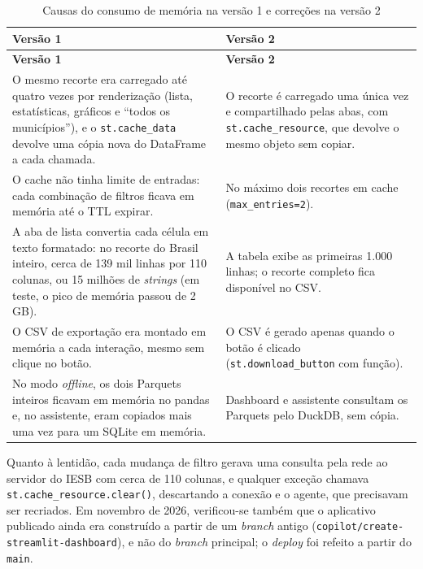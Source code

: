 \documentclass[12pt,a4paper]{report}
\begin{document}
\begin{longtable}{>{\raggedright\arraybackslash}p{} >{\raggedright\arraybackslash}p{}}
\caption{Causas do consumo de memória na versão 1 e correções na versão 2}\label{tab:memoria}\\
\toprule
\textbf{Versão 1} & \textbf{Versão 2} \\
\midrule
\endfirsthead
\toprule
\textbf{Versão 1} & \textbf{Versão 2} \\
\midrule
\endhead
O mesmo recorte era carregado até quatro vezes por renderização (lista, estatísticas,
gráficos e ``todos os municípios''), e o \texttt{st.cache\_data} devolve uma cópia nova
do DataFrame a cada chamada. &
O recorte é carregado uma única vez e compartilhado pelas abas, com
\texttt{st.cache\_resource}, que devolve o mesmo objeto sem copiar. \\
\midrule
O cache não tinha limite de entradas: cada combinação de filtros ficava em memória até o
TTL expirar. &
No máximo dois recortes em cache (\texttt{max\_entries=2}). \\
\midrule
A aba de lista convertia cada célula em texto formatado: no recorte do Brasil inteiro,
cerca de 139 mil linhas por 110 colunas, ou 15 milhões de \textit{strings} (em teste, o
pico de memória passou de 2 GB). &
A tabela exibe as primeiras 1.000 linhas; o recorte completo fica disponível no CSV. \\
\midrule
O CSV de exportação era montado em memória a cada interação, mesmo sem clique no botão. &
O CSV é gerado apenas quando o botão é clicado (\texttt{st.download\_button} com função). \\
\midrule
No modo \textit{offline}, os dois Parquets inteiros ficavam em memória no pandas e, no
assistente, eram copiados mais uma vez para um SQLite em memória. &
Dashboard e assistente consultam os Parquets pelo DuckDB, sem cópia. \\
\bottomrule
\end{longtable}

Quanto à lentidão, cada mudança de filtro gerava uma consulta pela rede ao servidor do
IESB com cerca de 110 colunas, e qualquer exceção chamava
\texttt{st.cache\_resource.clear()}, descartando a conexão e o agente, que precisavam ser recriados. Em novembro de 2026,
verificou-se também que o aplicativo publicado ainda era construído a partir de um
\textit{branch} antigo (\texttt{copilot/create-streamlit-dashboard}), e não do
\textit{branch} principal; o \textit{deploy} foi refeito a partir do \texttt{main}.
\end{document}
